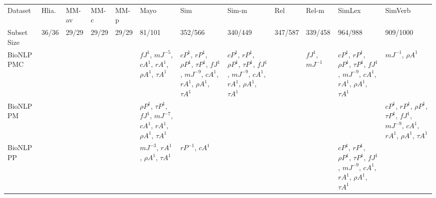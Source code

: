\documentclass[letterpaper]{article} %
\begin{document}
\begin{sidewaystable*}
    \centering
    \small
    \begin{tabular}{l l l l l l l l l l l l}
    \toprule
         Dataset & Hlia. & MM-av & MM-c & MM-p & Mayo & Sim & Sim-m & Rel & Rel-m & SimLex & SimVerb\\ 
Subset Size & 36/36 & 29/29 & 29/29 & 29/29 & 81/101 & 352/566 & 340/449 & 347/587 & 339/458 & 964/988 & 909/1000\\
\midrule
\multirow{6}{1.5cm}{BioNLP PMC} & \multirow{6}{1.5cm}{} & \multirow{6}{1.5cm}{} & \multirow{6}{1.5cm}{} & \multirow{6}{1.5cm}{} & \multirow{6}{1.5cm}{$fJ^{1}$, $mJ^{-5}$, $cA^{1}$, $r A^{1}$, $\rho A^{1}$, $\tau A^{1}$} & \multirow{6}{1.5cm}{$cP^{1}$, $r P^{1}$, $\rho P^{1}$, $\tau P^{1}$, $fJ^{1}$, $mJ^{-9}$, $cA^{1}$, $r A^{1}$, $\rho A^{1}$, $\tau A^{1}$} & \multirow{6}{1.5cm}{$cP^{1}$, $r P^{1}$, $\rho P^{1}$, $\tau P^{1}$, $fJ^{1}$, $mJ^{-9}$, $cA^{1}$, $r A^{1}$, $\rho A^{1}$, $\tau A^{1}$} & \multirow{6}{1.5cm}{} & \multirow{6}{1.5cm}{$fJ^{1}$, $mJ^{-1}$} & \multirow{6}{1.5cm}{$cP^{1}$, $r P^{1}$, $\rho P^{1}$, $\tau P^{1}$, $fJ^{1}$, $mJ^{-9}$, $cA^{1}$, $r A^{1}$, $\rho A^{1}$, $\tau A^{1}$} & \multirow{6}{1.5cm}{$mJ^{-1}$, $\rho A^{1}$} \\ \\ \\ \\ \\ \\
\midrule
\multirow{6}{1.5cm}{BioNLP PM} & \multirow{6}{1.5cm}{} & \multirow{6}{1.5cm}{} & \multirow{6}{1.5cm}{} & \multirow{6}{1.5cm}{} & \multirow{6}{1.5cm}{$\rho P^{1}$, $\tau P^{1}$, $fJ^{1}$, $mJ^{-7}$, $cA^{1}$, $r A^{1}$, $\rho A^{1}$, $\tau A^{1}$} & \multirow{6}{1.5cm}{} & \multirow{6}{1.5cm}{} & \multirow{6}{1.5cm}{} & \multirow{6}{1.5cm}{} & \multirow{6}{1.5cm}{} & \multirow{6}{1.5cm}{$cP^{1}$, $r P^{1}$, $\rho P^{1}$, $\tau P^{1}$, $fJ^{1}$, $mJ^{-9}$, $cA^{1}$, $r A^{1}$, $\rho A^{1}$, $\tau A^{1}$} \\ \\ \\ \\ \\ \\
\midrule
\multirow{6}{1.5cm}{BioNLP PP} & \multirow{6}{1.5cm}{} & \multirow{6}{1.5cm}{} & \multirow{6}{1.5cm}{} & \multirow{6}{1.5cm}{} & \multirow{6}{1.5cm}{$mJ^{-3}$, $r A^{1}$, $\rho A^{1}$, $\tau A^{1}$} & \multirow{6}{1.5cm}{$r P^{-1}$, $cA^{1}$} & \multirow{6}{1.5cm}{} & \multirow{6}{1.5cm}{} & \multirow{6}{1.5cm}{} & \multirow{6}{1.5cm}{$cP^{1}$, $r P^{1}$, $\rho P^{1}$, $\tau P^{1}$, $fJ^{1}$, $mJ^{-9}$, $cA^{1}$, $r A^{1}$, $\rho A^{1}$, $\tau A^{1}$} & \multirow{6}{1.5cm}{} \\ \\ \\ \\ \\ \\

\end{tabular}
\end{sidewaystable*}
\end{document}
